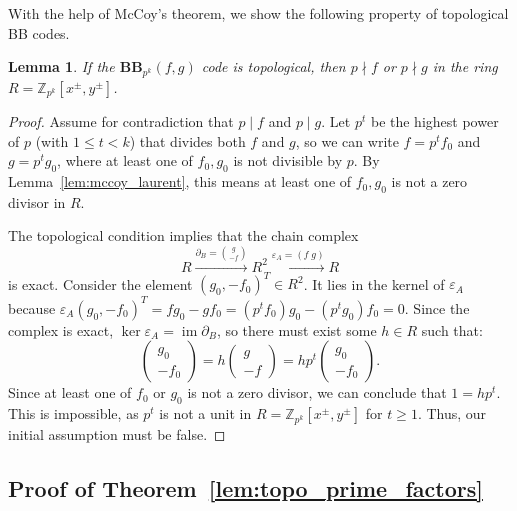 \documentclass[aps,prb,english,superscriptaddress,twocolumn,tightenlines,showpacs,longbibliography,floatfix,amsfonts]{revtex4-2}
\newtheorem{lem}{Lemma}
\begin{document}
With the help of McCoy's theorem, we show the following property of topological BB codes.
\begin{lem}
If the $\mathbf{BB}_{p^k}(f,g)$ code is topological, then $p \nmid f$ or $p \nmid g$ in the ring $R = \mathbb{Z}_{p^k}[x^\pm, y^\pm]$.
\label{lem:TO_and_GSD}
\end{lem}
\begin{proof}
Assume for contradiction that $p \mid f$ and $p \mid g$. Let $p^t$ be the highest power of $p$ (with $1 \le t < k$) that divides both $f$ and $g$, so we can write $f = p^t f_0$ and $g = p^t g_0$, where at least one of $f_0, g_0$ is not divisible by $p$. By Lemma~\ref{lem:mccoy_laurent}, this means at least one of $f_0, g_0$ is not a zero divisor in $R$.

The topological condition implies that the chain complex
\begin{equation}
    R\xrightarrow{{\partial_B = {g \choose -f} }}{R^2}\xrightarrow{{\varepsilon_A = (f\; g)}}R \label{eq:exact_proof_0}
\end{equation}
is exact. Consider the element $(g_0, -f_0)^T \in R^2$. It lies in the kernel of $\varepsilon_A$ because $\varepsilon_A (g_0,-f_0)^T = f g_0 - g f_0 = (p^t f_0)g_0 - (p^t g_0)f_0 = 0$.
Since the complex is exact, $\ker\varepsilon_A = \operatorname{im}\partial_B$, so there must exist some $h \in R$ such that:
\begin{equation}
    \begin{pmatrix} g_0 \\ -f_0 \end{pmatrix} = h \begin{pmatrix} g \\ -f \end{pmatrix} = h p^t \begin{pmatrix} g_0 \\ -f_0 \end{pmatrix}. \label{eq:exact_proof}
\end{equation}
Since at least one of $f_0$ or $g_0$ is not a zero divisor, we can conclude that $1 = h p^t$. This is impossible, as $p^t$ is not a unit in $R = \mathbb{Z}_{p^k}[x^\pm, y^\pm]$ for $t \ge 1$. Thus, our initial assumption must be false.
\end{proof}

\subsection{Proof of Theorem~\ref{lem:topo_prime_factors}}
\end{document}
